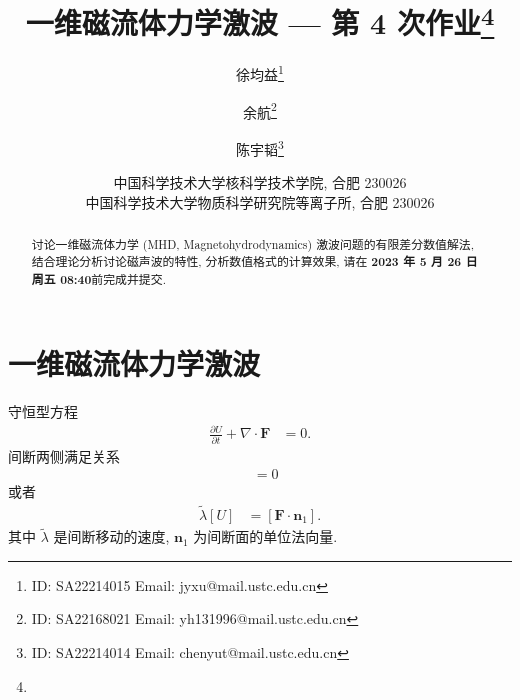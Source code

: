 \documentclass[10.5pt
]{article}
\title{一维磁流体力学激波 --- 第 4 次作业\footnote{\Term\Course}}
\author{徐均益\footnote{ID: SA22214015 Email: jyxu@mail.ustc.edu.cn}
  \and
  余航\footnote{ID: SA22168021 Email: yh131996@mail.ustc.edu.cn}
  \and
  陈宇韬\footnote{ID: SA22214014 Email: chenyut@mail.ustc.edu.cn}
}
\date{%
\scriptsize%
中国科学技术大学核科学技术学院, 合肥 230026 \\
中国科学技术大学物质科学研究院等离子所, 合肥 230026
%
}
\def\due{2023 年 5 月 26 日周五 08:40}
\begin{document}
\maketitle

\begin{abstract}
讨论一维磁流体力学 (MHD, Magnetohydrodynamics) 激波问题的有限差分数值解法, 结合理论分析讨论磁声波的特性,
分析数值格式的计算效果, 请在 \textbf{\due}前完成并提交.
\end{abstract}

\section{一维磁流体力学激波\citep{Jeffrey1964}}
守恒型方程
\begin{align}
\frac{\partial U}{\partial t} + \nabla \cdot \boldsymbol{F} &= 0. \label{Eqn:3.1.6}
\end{align}
间断两侧满足关系
\begin{align}
[\tilde{\lambda} U - \boldsymbol{F} \cdot \boldsymbol{n}_1] &= 0 \label{Eqn:3.1.11}
\end{align}
或者
\begin{align}
\tilde{\lambda} [U] &= [\boldsymbol{F} \cdot \boldsymbol{n}_1]. \label{Eqn:3.1.11a}
\end{align}
其中 $\tilde{\lambda}$ 是间断移动的速度, $\boldsymbol{n}_1$ 为间断面的单位法向量.
\end{document}
